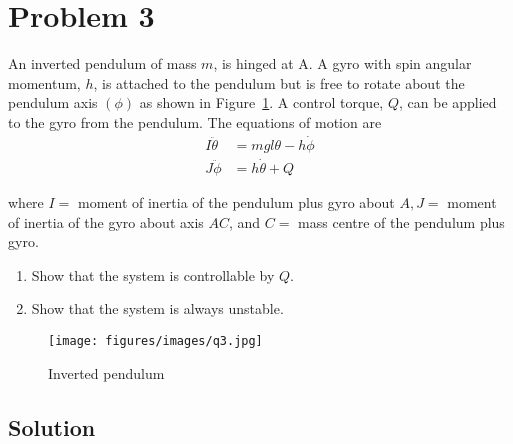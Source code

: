 \section*{Problem 3}

An inverted pendulum of mass \( m \), is hinged at A.
A gyro with spin angular momentum, \( h \), is attached to the pendulum but is free to rotate about the pendulum axis \( (\phi) \) as shown in Figure~\ref{fig:q3}.
A control torque, \( Q \), can be applied to the gyro from the pendulum.
The equations of motion are
\vspace*{-1em}
\begin{align*}
    I \ddot{\theta} & =m g l \theta-h \dot{\phi} \\
    J \ddot{\phi}   & =h \dot{\theta}+Q
\end{align*}

\vspace*{-0.5em}
where \( I= \) moment of inertia of the pendulum plus gyro about \( A, J= \) moment of inertia of the gyro about axis \( A C \), and \( C= \) mass centre of the pendulum plus gyro.
\begin{enumerate}[label= (\alph*), topsep=3pt, itemsep=-0.25em]
    \item Show that the system is controllable by \( Q \).
    \item Show that the system is always unstable.
\end{enumerate}
\vspace*{-1.5em}
\begin{figure}[h]
    \centering
    \texttt{[image: figures/images/q3.jpg]}
    \caption{
        Inverted pendulum
    }\label{fig:q3}
\end{figure}
\vspace*{-3em}

\subsection*{Solution}

